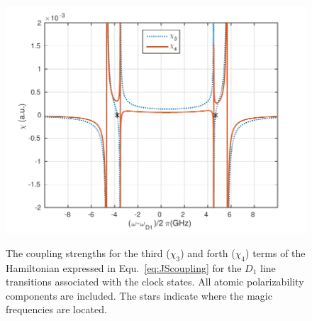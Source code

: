 \begin{figure}
\begin{minipage}{.91\linewidth}
\centering
{\includegraphics[scale=0.75]{./Figs/chi34_total}}
\end{minipage}
\caption{The coupling strengths for the third ($ \chi_3 $) and forth ($ \chi_4 $) terms of the Hamiltonian 
expressed in Equ.~\eqref{eq:JScoupling} for the $ D_1 $ line transitions associated with the clock states. 
All atomic polarizability components are included. The stars indicate where the magic frequencies are 
located.} 
\label{fig:chi34_total}
\end{figure}
